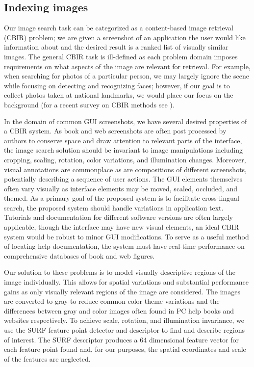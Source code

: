 \documentclass{www2010-submission}
\begin{document}
\subsection{Indexing images}
Our image search task can be categorized as a content-based image
retrieval (CBIR) problem; we are given a screenshot of an application
the user would like information about and the desired result is a
ranked list of visually similar images.  The general CBIR task is
ill-defined as each problem domain imposes requirements on what
aspects of the image are relevant for retrieval.  For example, when
searching for photos of a particular person, we may largely ignore the
scene while focusing on detecting and recognizing faces; however, if
our goal is to collect photos taken at national landmarks, we
would place our focus on the background (for a recent survey on CBIR
methods see \cite{Datta1348248}).

In the domain of common GUI screenshots, we have several desired
properties of a CBIR system.  As book and web screenshots are often
post processed by authors to conserve space and draw attention to
relevant parts of the interface, the image search solution should be
invariant to image manipulations including cropping, scaling,
rotation, color variations, and illumination changes.  Moreover,
visual annotations are commonplace as are compositions of different
screenshots, potentially describing a sequence of user actions.  The
GUI elements themselves often vary visually as interface elements may
be moved, scaled, occluded, and themed.  As a primary goal of the
proposed system is to facilitate cross-lingual search, the proposed
system should handle variations in application text.  Tutorials and
documentation for different software versions are often largely
applicable, though the interface may have new visual elements, an
ideal CBIR system would be robust to minor GUI modifications.  To
serve as a useful method of locating help documentation, the system
must have real-time performance on comprehensive databases of book and
web figures.

Our solution to these problems is to model visually descriptive
regions of the image individually.  This allows for spatial variations
and substantial performance gains as only visually relevant regions
of the image are considered.  The images are converted to gray to
reduce common color theme variations and the differences between gray
and color images often found in PC help books and websites
respectively.  To achieve scale, rotation, and illumination
invariance, we use the SURF feature point detector and descriptor
\cite{VanGool1370556} to find and describe regions of interest.  The
SURF descriptor produces a 64 dimensional feature vector for each
feature point found and, for our purposes, the spatial coordinates and
scale of the features are neglected.
\end{document}
